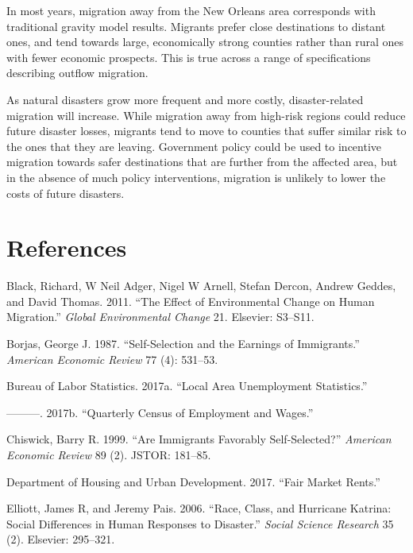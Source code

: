 \documentclass[]{article}
\begin{document}
In most years, migration away from the New Orleans area corresponds with
traditional gravity model results. Migrants prefer close destinations to
distant ones, and tend towards large, economically strong counties
rather than rural ones with fewer economic prospects. This is true
across a range of specifications describing outflow migration.

As natural disasters grow more frequent and more costly,
disaster-related migration will increase. While migration away from
high-risk regions could reduce future disaster losses, migrants tend to
move to counties that suffer similar risk to the ones that they are
leaving. Government policy could be used to incentive migration towards
safer destinations that are further from the affected area, but in the
absence of much policy interventions, migration is unlikely to lower the
costs of future disasters.

\newpage

\section{References}\label{references}

\hypertarget{refs}{}
\hypertarget{ref-black2011effect}{}
Black, Richard, W Neil Adger, Nigel W Arnell, Stefan Dercon, Andrew
Geddes, and David Thomas. 2011. ``The Effect of Environmental Change on
Human Migration.'' \emph{Global Environmental Change} 21. Elsevier:
S3--S11.

\hypertarget{ref-borjas1987self}{}
Borjas, George J. 1987. ``Self-Selection and the Earnings of
Immigrants.'' \emph{American Economic Review} 77 (4): 531--53.

\hypertarget{ref-blsdata}{}
Bureau of Labor Statistics. 2017a. ``Local Area Unemployment
Statistics.''

\hypertarget{ref-qcewdata}{}
---------. 2017b. ``Quarterly Census of Employment and Wages.''

\hypertarget{ref-chiswick1999immigrants}{}
Chiswick, Barry R. 1999. ``Are Immigrants Favorably Self-Selected?''
\emph{American Economic Review} 89 (2). JSTOR: 181--85.

\hypertarget{ref-hudrentdata}{}
Department of Housing and Urban Development. 2017. ``Fair Market
Rents.''

\hypertarget{ref-elliott2006race}{}
Elliott, James R, and Jeremy Pais. 2006. ``Race, Class, and Hurricane
Katrina: Social Differences in Human Responses to Disaster.''
\emph{Social Science Research} 35 (2). Elsevier: 295--321.
\end{document}
